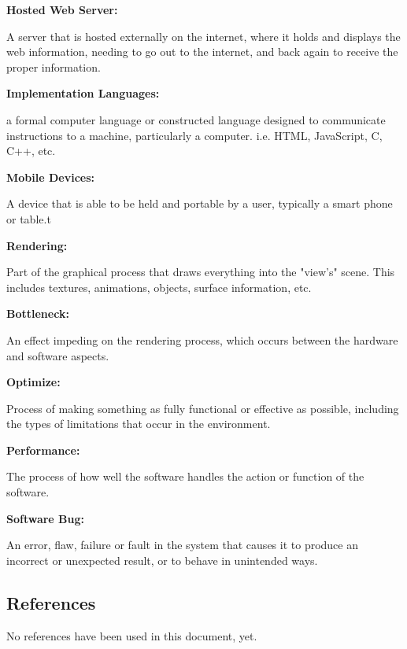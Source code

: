\documentclass[letterpaper,10pt,titlepage,draftclsnofoot,onecolumn,compsoc,utf8,latin1]{IEEEtran}
\begin{document}
\begin{singlespace}
\begin{enumerate}[labelsep=2em,leftmargin=.5in]
    {\item \bfseries Hosted Web Server: } A server that is hosted externally on the internet, where it holds and displays the web information, needing to go out to the internet, and back again to receive the proper information. \vspace{.1cm}
    {\item \bfseries Implementation Languages: } a formal computer language or constructed language designed to communicate instructions to a machine, particularly a computer. i.e. HTML, JavaScript, C, C++, etc. \vspace{.1cm}
    {\item \bfseries Mobile Devices: } A device that is able to be held and portable by a user, typically a smart phone or table.t\vspace{.1cm}
    {\item \bfseries Rendering: } Part of the graphical process that draws everything into the "view's" scene. This includes textures, animations, objects, surface information, etc. \vspace{.1cm}
    {\item \bfseries Bottleneck: } An effect impeding on the rendering process, which occurs between the hardware and software aspects. \vspace{.1cm}
    {\item \bfseries Optimize: } Process of making something as fully functional or effective as possible, including the types of limitations that occur in the environment. \vspace{.1cm}
    {\item \bfseries Performance: } The process of how well the software handles the action or function of the software.
    {\item \bfseries Software Bug: } An error, flaw, failure or fault in the system that causes it to produce an incorrect or unexpected result, or to behave in unintended ways. \vspace{.1cm}
\end{enumerate}

\end{singlespace}

\subsection{References}
\begin{singlespace}
\noindent
No references have been used in this document, yet.
\end{singlespace}
\end{document}
